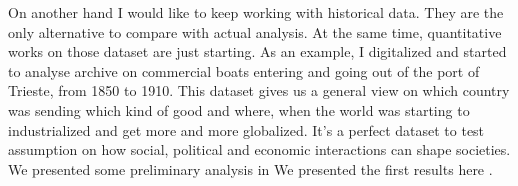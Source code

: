 \documentclass[10pt]{article}
\begin{document}
On another hand I would like to keep working with historical data. They are the only alternative to compare with actual analysis. At the same time, quantitative works on those dataset are just starting. As an example, I digitalized and started to analyse archive on commercial boats entering and going out of the port of Trieste, from 1850 to 1910. This dataset gives us a general view on which country was sending which kind of good and where, when the world was starting to industrialized and get more and more globalized. It's a perfect dataset to test assumption  on how social, political and economic interactions can shape societies. We presented some preliminary analysis in We presented the first results here \cite{carrignon2016patternsinglobalization}.




                   
\end{document}
